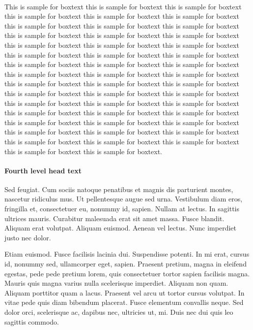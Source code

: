 \documentclass[AMS,STIX2COL]{WileyNJD-v2}
\begin{document}
    \begin{boxtext}
        \\
        This is sample for boxtext this is sample for boxtext this is sample for boxtext this is sample for boxtext this is sample for boxtext this is sample for boxtext this is sample for boxtext this is sample for boxtext this is sample for boxtext this is sample for boxtext this is sample for boxtext this is sample for boxtext this is sample for boxtext this is sample for boxtext this is sample for boxtext this is sample for boxtext this is sample for boxtext this is sample for boxtext this is sample for boxtext this is sample for boxtext this is sample for boxtext this is sample for boxtext this is sample for boxtext this is sample for boxtext this is sample for boxtext this is sample for boxtext this is sample for boxtext this is sample for boxtext this is sample for boxtext this is sample for boxtext this is sample for boxtext this is sample for boxtext this is sample for boxtext this is sample for boxtext this is sample for boxtext this is sample for boxtext this is sample for boxtext this is sample for boxtext this is sample for boxtext this is sample for boxtext this is sample for boxtext this is sample for boxtext this is sample for boxtext this is sample for boxtext this is sample for boxtext this is sample for boxtext this is sample for boxtext.
    \end{boxtext}

    \paragraph{Fourth level head text}

    Sed feugiat. Cum sociis natoque penatibus et magnis dis parturient montes, nascetur ridiculus mus. Ut pellentesque
    augue sed urna. Vestibulum diam eros, fringilla et, consectetuer eu, nonummy id, sapien. Nullam at lectus. In sagittis
    ultrices mauris. Curabitur malesuada erat sit amet massa. Fusce blandit. Aliquam erat volutpat. Aliquam euismod.
    Aenean vel lectus. Nunc imperdiet justo nec dolor.

    Etiam euismod. Fusce facilisis lacinia dui. Suspendisse potenti. In mi erat, cursus id, nonummy sed, ullamcorper
    eget, sapien. Praesent pretium, magna in eleifend egestas, pede pede pretium lorem, quis consectetuer tortor sapien
    facilisis magna. Mauris quis magna varius nulla scelerisque imperdiet. Aliquam non quam. Aliquam porttitor quam
    a lacus. Praesent vel arcu ut tortor cursus volutpat. In vitae pede quis diam bibendum placerat. Fusce elementum
    convallis neque. Sed dolor orci, scelerisque ac, dapibus nec, ultricies ut, mi. Duis nec dui quis leo sagittis commodo.
\end{document}
